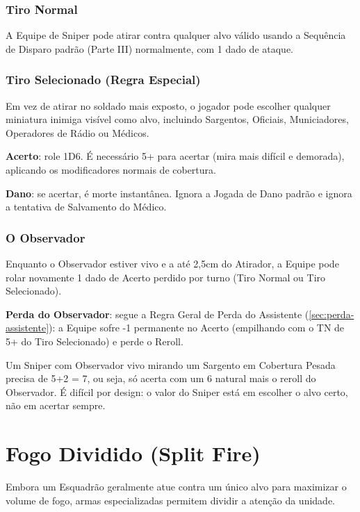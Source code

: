 \subsubsection{Tiro Normal}

A Equipe de Sniper pode atirar contra qualquer alvo válido usando a Sequência de Disparo padrão (Parte III) normalmente, com 1 dado de ataque.

\subsubsection{Tiro Selecionado (Regra Especial)}

Em vez de atirar no soldado mais exposto, o jogador pode escolher qualquer miniatura inimiga visível como alvo, incluindo Sargentos, Oficiais, Municiadores, Operadores de Rádio ou Médicos.

\textbf{Acerto}: role 1D6. É necessário 5+ para acertar (mira mais difícil e demorada), aplicando os modificadores normais de cobertura.

\textbf{Dano}: se acertar, é morte instantânea. Ignora a Jogada de Dano padrão e ignora a tentativa de Salvamento do Médico.

\subsubsection{O Observador}

Enquanto o Observador estiver vivo e a até 2,5cm do Atirador, a Equipe pode rolar novamente 1 dado de Acerto perdido por turno (Tiro Normal ou Tiro Selecionado).

\textbf{Perda do Observador}: segue a Regra Geral de Perda do Assistente (\ref{sec:perda-assistente}): a Equipe sofre -1 permanente no Acerto (empilhando com o TN de 5+ do Tiro Selecionado) e perde o Reroll.

\begin{nota}
Um Sniper com Observador vivo mirando um Sargento em Cobertura Pesada precisa de 5+2 = 7, ou seja, só acerta com um 6 natural mais o reroll do Observador. É difícil por design: o valor do Sniper está em escolher o alvo certo, não em acertar sempre.
\end{nota}

\section{Fogo Dividido (Split Fire)}

Embora um Esquadrão geralmente atue contra um único alvo para maximizar o volume de fogo, armas especializadas permitem dividir a atenção da unidade.

